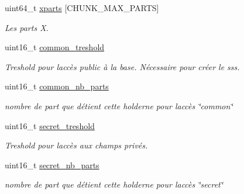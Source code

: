 \begin{DoxyCompactItemize}
\mbox{\label{structt__chunk__holder_af777d5bbd579f6605dbd51c040ac7d03}} 
uint64\+\_\+t \hyperlink{structt__chunk__holder_af777d5bbd579f6605dbd51c040ac7d03}{xparts} \mbox{[}C\+H\+U\+N\+K\+\_\+\+M\+A\+X\+\_\+\+P\+A\+R\+TS\mbox{]}
\begin{DoxyCompactList}\small\item\em Les parts X. \end{DoxyCompactList}\item 
\mbox{\label{structt__chunk__holder_a616d7141187b5a98acb2fa0e01e85f33}} 
uint16\+\_\+t \hyperlink{structt__chunk__holder_a616d7141187b5a98acb2fa0e01e85f33}{common\+\_\+treshold}
\begin{DoxyCompactList}\small\item\em Treshold pour l\textquotesingle{}accès public à la base. Nécessaire pour créer le sss. \end{DoxyCompactList}\item 
\mbox{\label{structt__chunk__holder_a346269d7e81b5ea5b7917e5e6dcf64c4}} 
uint16\+\_\+t \hyperlink{structt__chunk__holder_a346269d7e81b5ea5b7917e5e6dcf64c4}{common\+\_\+nb\+\_\+parts}
\begin{DoxyCompactList}\small\item\em nombre de part que détient cette holderne pour l\textquotesingle{}accès \char`\"{}common\char`\"{} \end{DoxyCompactList}\item 
\mbox{\label{structt__chunk__holder_a434d05557455ce32cb6894a327f7ef2e}} 
uint16\+\_\+t \hyperlink{structt__chunk__holder_a434d05557455ce32cb6894a327f7ef2e}{secret\+\_\+treshold}
\begin{DoxyCompactList}\small\item\em Treshold pour l\textquotesingle{}accès aux champs privés. \end{DoxyCompactList}\item 
\mbox{\label{structt__chunk__holder_a87ebd40237441a9f7a38545ee3d31f03}} 
uint16\+\_\+t \hyperlink{structt__chunk__holder_a87ebd40237441a9f7a38545ee3d31f03}{secret\+\_\+nb\+\_\+parts}
\begin{DoxyCompactList}\small\item\em nombre de part que détient cette holderne pour l\textquotesingle{}accès \char`\"{}secret\char`\"{} \end{DoxyCompactList}\item 

\end{DoxyCompactItemize}
